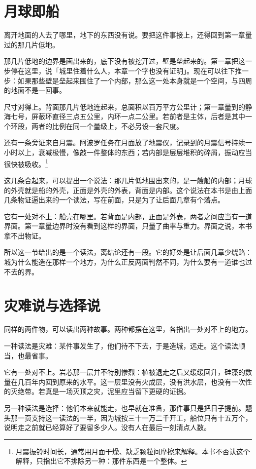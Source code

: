 \section{月球即船}

离开地面的人去了哪里，地下的东西没有说。要把这件事接上，还得回到第一章量过的那几片低地。

那几片低地的边界是画出来的，底下没有被挖开过，壁是垒起来的。第一章把这一步停在这里，说「城里住着什么人，本章一个字也没有证明」。现在可以往下推一步：如果那些壁是垒起来围住了一个内部，那么这一处本身就是一个空间，与四周的地面不是一回事。

尺寸对得上。背面那几片低地连起来，总面积以百万平方公里计；第一章量到的静海七号，屏蔽环直径三点五公里，内环一点二公里。若前者是主体，后者是其中一个环段，两者的比例在同一个量级上，不必另设一套尺度。

还有一条旁证来自月震。阿波罗任务在月面放了地震仪，记录到的月震信号持续一小时以上，衰减极慢，像敲一件整体的东西；若内部是层层堆积的碎屑，振动应当很快被吸收。\footnote{月震振铃时间长，通常用月面干燥、缺乏颗粒间摩擦来解释。本书不否认这个解释，只指出它不排除另一种：那件东西是一个整体。}

这几条合起来，可以提出一个说法：那几片低地围出来的，是一艘船的内部；月球的外壳就是船的外壳，正面是外壳的外表，背面是内部。这个说法在本书是由上面几条物证逼出来的一个读法，写在前面，只是为了让后面几章有个落点。

它有一处对不上：船壳在哪里。若背面是内部，正面是外表，两者之间应当有一道界面。第一章量边界时没有看到这样的界面，只量了曲率与重力。界面之说，本书拿不出物证。

所以这一节给出的是一个读法，离结论还有一段。它的好处是让后面几章少绕路：城为什么能造在那样一个地方，为什么正反两面判然不同，为什么要有一道谁也过不去的界。

\section{灾难说与选择说}

同样的两件物，可以读出两种故事。两种都摆在这里，各指出一处对不上的地方。

一种读法是灾难：某件事发生了，他们待不下去，于是造城，远走。这个读法顺当，也最省事。

它有一处对不上。岩芯那一层并不特别惨烈：植被退走之后又缓缓回升，硅藻的数量在几百年内回到原来的水平。这一层里没有火成层，没有洪水层，也没有一次性的灭绝带。若真是一场灭顶之灾，泥里应当留下更硬的证据。

另一种读法是选择：他们本来就能走，也早就在准备，那件事只是把日子提前。题头那一页支持这一读法的一半，因为城按三十一万二千开工，船位只有十五万个，说明走之前就已经算好了要留多少人。没有人在最后一刻清点人数。

